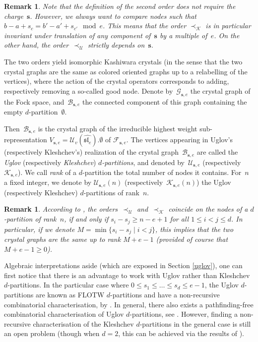 \documentclass[twoside,12pt]{amsart}
\theoremstyle{plain}
\newtheorem{rem}[num]{Remark}
\begin{document}
\begin{rem}\label{klorder}
{\rm
Note that the definition of the second order does not require the charge~${\mathbf{s}}$.
However, we always want to compare nodes such that $b-a+s_c = 
b'-a'+s_{c'} \mod e$. This means that the order $\prec_{\mathcal{K}}$ is in particular 
invariant under translation of any component of~${\mathbf{s}}$ by a multiple of~$e$.
On the other hand, the order~$\prec_{\mathcal{U}}$ strictly depends on~${\mathbf{s}}$.
}
\end{rem}

The two orders yield isomorphic Kashiwara crystals (in the sense that the 
two crystal graphs are the same as colored oriented graphs up to a relabelling 
of the vertices), where the action of the crystal operators corresponds to 
adding, respectively removing a so-called good node. Denote by~${\mathcal{G}}_{{\mathbf{s}},e}$ 
the crystal graph of the Fock space, and~${\mathcal{B}}_{{\mathbf{s}},e}$ the connected component 
of this graph containing the empty $d$-partition~${\boldsymbol{\emptyset}}$.

Then~${\mathcal{B}}_{{\mathbf{s}},e}$ is the crystal graph of the irreducible highest weight 
sub-representation $V_{{\mathbf{s}},e}={\mathcal{U}_v (\widehat{\mathfrak{sl}_e})}.{\boldsymbol{\emptyset}}$ of ${\mathcal{F}}_{{\mathbf{s}},e}$. The vertices 
appearing in Uglov's (respectively Kleshchev's) realization of the crystal 
graph~${\mathcal{B}}_{{\mathbf{s}},e}$ are called the \textit{Uglov} (respectively 
\textit{Kleshchev}) \textit{$d$-partitions}, and denoted by~${\mathcal{U}}_{{\mathbf{s}},e}$ 
(respectively~${\mathcal{K}}_{{\mathbf{s}},e}$). We call \textit{rank} of a $d$-partition the 
total number of nodes it contains. For~$n$ a fixed integer, we denote by 
${\mathcal{U}}_{{\mathbf{s}},e}(n)$ (respectively~${\mathcal{K}}_{{\mathbf{s}},e}(n)$) the Uglov (respectively 
Kleshchev) $d$-partitions of rank~$n$.

\begin{rem}\label{kl=ug}
{\rm
According to \cite[Proposition 5.1]{Gerber2014}, the orders~$\prec_{\mathcal{U}}$ 
and~$\prec_{\mathcal{K}}$ coincide on the nodes of a $d$-partition of rank~$n$, if 
and only if $s_i-s_j \geq n-e+1$ for all $1\leq i<j \leq d$.
In particular, if we denote $M=\min\{s_i-s_j \mid i<j\}$, this implies that 
the two crystal graphs are the same up to rank $M+e-1$ (provided of course
that $M+e-1\geq0$).
}
\end{rem}

Algebraic interpretations aside (which are exposed in Section \ref{uglov}),
one can first notice that there is an advantage to work with Uglov rather than 
Kleshchev $d$-partitions. In the particular case where $0\leq s_1 \leq \dots 
\leq s_d \leq e-1$, the Uglov $d$-partitions are known as FLOTW $d$-partitions 
and have a non-recursive combinatorial characterisation, by 
\cite[Theorem 2.10]{FLOTW1999}. In general, there also exists a pathfinding-free 
combinatorial characterisation of Uglov $d$-partitions, see 
\cite[Theorem 6.3]{Gerber2014a}. However, finding a non-recursive 
characterisation of the Kleshchev $d$-partitions in the general case is still 
an open problem (though when $d=2$, this can be achieved via the results of 
\cite[Section 9]{ArikiKreimanTsuchioka2007}).
\end{document}
